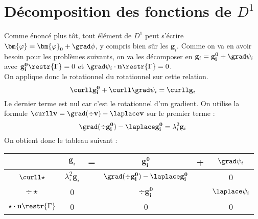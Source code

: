 \section{Décomposition des fonctions de $D^1$}
\label{decomp}

Comme énoncé plus tôt, tout élément de $D^1$ peut s'écrire $\bm{\varphi} = \bm{\varphi}_0 + \grad\phi$, y compris bien sûr les $\mathbf{g}_i$. Comme on va en avoir besoin pour les problèmes suivants, on va les décomposer en $\mathbf{g}_i=\mathbf{g_i^0}+\grad\psi_i$ avec $\mathbf{g_i^0}\restr{\Gamma} = 0$ et $\grad\psi_i\cdot \mathbf{n}\restr{\Gamma} = 0$.\\
On applique donc le rotationnel du rotationnel sur cette relation.\\
\[ \curll \mathbf{g_i^0} +\curll\grad\psi_i = \curll \mathbf{g}_i \]
Le dernier terme est nul car c'est le rotationnel d'un gradient. On utilise la formule $\curll \mathbf{v}=\grad(\div \mathbf{v})-\laplace \mathbf{v}$ sur le premier terme :
\[ \grad(\div \mathbf{g_i^0})-\laplace \mathbf{g_i^0} = \lambda_i^2 \mathbf{g}_i \]
On obtient donc le tableau suivant :
\begin{center}
\begin{tabular}{c|ccccc}
& $\mathbf{g}_i$ & = & $\mathbf{g_i^0}$ & + & $\grad\psi_i$ \\ \hline
$\curll\star$ & $\lambda_i^2\mathbf{g}_i$ & & $\grad(\div \mathbf{g_i^0})-\laplace \mathbf{g_i^0}$ & & 0\\ \hline
$\div\star$ & 0 & & $\div \mathbf{g_i^0}$ & & $\laplace\psi_i$\\ \hline
$\star\cdot \mathbf{n}\restr{\Gamma}$ & 0 & & 0 & & 0
\end{tabular}
\end{center}

